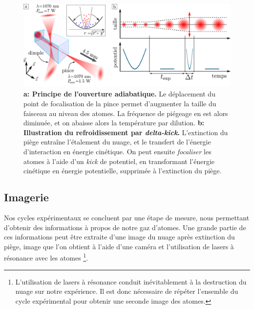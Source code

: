 \begin{figure}
\centering
\includegraphics[width=\textwidth]{Fig/BEC_manip/adia_opening_and_delta_kick2.pdf}
\caption{\textbf{a: Principe de l'ouverture adiabatique.} Le déplacement du point de focalisation de la pince permet d'augmenter la taille du faisceau au niveau des atomes. La fréquence de piégeage en est alors diminuée, et on abaisse alors la température par dilution. \textbf{b: Illustration du refroidissement par \emph{delta-kick}.} L'extinction du piège entraîne l'étalement du nuage, et le transfert de l'énergie d'interaction en énergie cinétique. On peut ensuite \textit{focaliser} les atomes à l'aide d'un \textit{kick} de potentiel, en transformant l'énergie cinétique en énergie potentielle, supprimée à l'extinction du piège.}
\label{fig:adia_opening_and_delta_kick}
\end{figure}















\subsection{Imagerie}
\label{sc:imagerie}
Nos cycles expérimentaux se concluent par une étape de mesure, nous permettant d'obtenir des informations à propos de notre gaz d'atomes. Une grande partie de ces informations peut être extraite d'une image du nuage après extinction du piège, image que l'on obtient à l'aide d'une caméra et l'utilisation de lasers à résonance avec les atomes \footnote{L'utilisation de lasers à résonance conduit inévitablement à la destruction du nuage sur notre expérience. Il est donc nécessaire de répéter l'ensemble du cycle expérimental pour obtenir une seconde image des atomes.}. %

